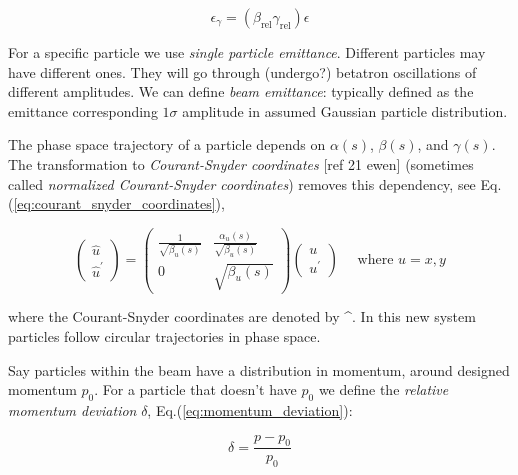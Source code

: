 \begin{equation}
    \epsilon_{\gamma} = (\beta_{\mathrm{rel}} \gamma_{\mathrm{rel}}) \epsilon
    \label{eq:normalized_emittance}
\end{equation}
\bigbreak

For a specific particle we use \emph{single particle emittance}.
Different particles may have different ones.
They will go through (undergo?) betatron oscillations of different amplitudes.
We can define \emph{beam emittance}: typically defined as the emittance corresponding $1\sigma$ amplitude in assumed Gaussian particle distribution.
\bigbreak

The phase space trajectory of a particle depends on $\alpha(s)$, $\beta(s)$, and $\gamma(s)$.
The transformation to \emph{Courant-Snyder coordinates} [ref 21 ewen] (sometimes called \emph{normalized Courant-Snyder coordinates}) removes this dependency, see Eq.(\ref{eq:courant_snyder_coordinates}),
\bigbreak

\begin{equation}
    \left(\begin{array}{c}
    \hat{u} \\
    \hat{u}^{\prime}
    \end{array}\right) = \left(\begin{array}{cc}
    \frac{1}{\sqrt{\beta_{u}(s)}} & \frac{\alpha_{u}(s)}{\sqrt{\beta_{u}(s)}} \\
    0 & \sqrt{\beta_{u}(s)}
    \end{array}\right)\left(\begin{array}{c}
    u \\
    u^{\prime}
    \end{array}\right) \quad \text{ where } u = x, y
    \label{eq:courant_snyder_coordinates}
\end{equation}

where the Courant-Snyder coordinates are denoted by \^{}.
In this new system particles follow circular trajectories in phase space.
\bigbreak

Say particles within the beam have a distribution in momentum, around designed momentum $p_0$.
For a particle that doesn't have $p_0$ we define the \textit{relative momentum deviation} $\delta$, Eq.(\ref{eq:momentum_deviation}):
\bigbreak

\begin{equation}
    \delta = \frac{p - p_0}{p_0}
    \label{eq:momentum_deviation}
\end{equation}
\bigbreak

